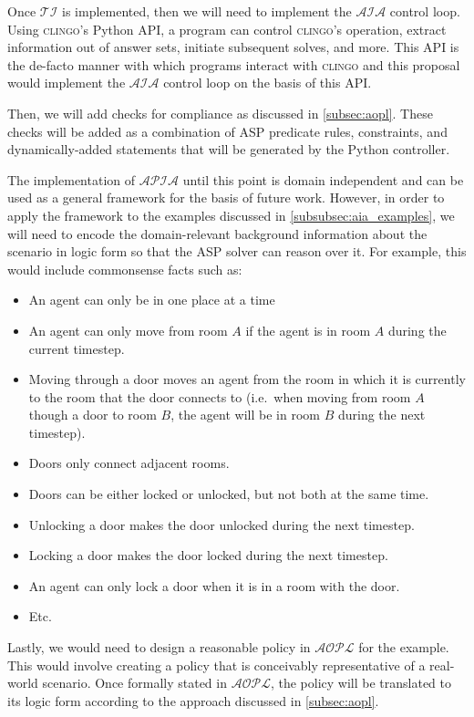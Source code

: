 Once $\mathcal{TI}$ is implemented, then we will need to implement the $\mathcal{AIA}$ control loop.
Using \textsc{clingo}'s Python API, a program can control \textsc{clingo}'s operation, extract information out of answer sets, initiate subsequent solves, and more.
This API is the de-facto manner with which programs interact with \textsc{clingo} and this proposal would implement the $\mathcal{AIA}$ control loop on the basis of this API.

Then, we will add checks for compliance as discussed in \cref{subsec:aopl}.
These checks will be added as a combination of ASP predicate rules, constraints, and dynamically-added statements that will be generated by the Python controller.

The implementation of $\mathcal{APIA}$ until this point is domain independent and can be used as a general framework for the basis of future work.
However, in order to apply the framework to the examples discussed in \cref{subsubsec:aia_examples}, we will need to encode the domain-relevant background information about the scenario in logic form so that the ASP solver can reason over it.
For example, this would include commonsense facts such as:

\begin{itemize}
    \item An agent can only be in one place at a time
    \item An agent can only move from room $A$ if the agent is in room $A$ during the current timestep.
    \item Moving through a door moves an agent from the room in which it is currently to the room that the door connects to (i.e.~when moving from room $A$ though a door to room $B$, the agent will be in room $B$ during the next timestep).
    \item Doors only connect adjacent rooms.
    \item Doors can be either locked or unlocked, but not both at the same time.
    \item Unlocking a door makes the door unlocked during the next timestep.
    \item Locking a door makes the door locked during the next timestep.
    \item An agent can only lock a door when it is in a room with the door.
    \item Etc.
\end{itemize}

Lastly, we would need to design a reasonable policy in $\mathcal{AOPL}$ for the example.
This would involve creating a policy that is conceivably representative of a real-world scenario.
Once formally stated in $\mathcal{AOPL}$, the policy will be translated to its logic form according to the approach discussed in \cref{subsec:aopl}.

